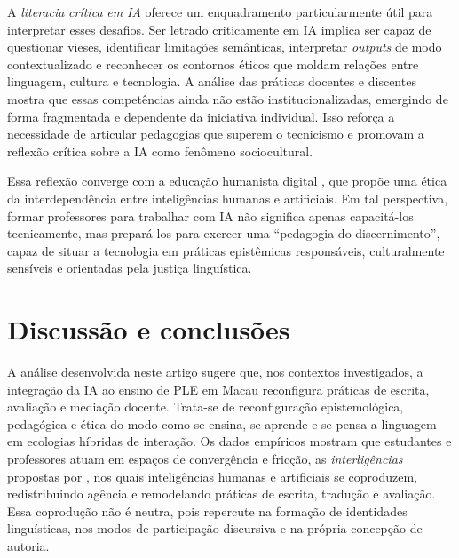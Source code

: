 \documentclass[portuguese]{textolivre}
\begin{document}
A \textit{literacia} \textit{crítica} \textit{em IA} oferece um enquadramento particularmente útil para interpretar esses desafios. Ser letrado criticamente em IA implica ser capaz de questionar vieses, identificar limitações semânticas, interpretar \textit{outputs} de modo contextualizado e reconhecer os contornos éticos que moldam relações entre linguagem, cultura e tecnologia. A análise das práticas docentes e discentes mostra que essas competências ainda não estão institucionalizadas, emergindo de forma fragmentada e dependente da iniciativa individual. Isso reforça a necessidade de articular pedagogias que superem o tecnicismo e promovam a reflexão crítica sobre a IA como fenômeno sociocultural.

Essa reflexão converge com a educação humanista digital \cite{AmaroZhang2025, PiresAmaro2025}, que propõe uma ética da interdependência entre inteligências humanas e artificiais. Em tal perspectiva, formar professores para trabalhar com IA não significa apenas capacitá-los tecnicamente, mas prepará-los para exercer uma “pedagogia do discernimento”, capaz de situar a tecnologia em práticas epistêmicas responsáveis, culturalmente sensíveis e orientadas pela justiça linguística.

\section{Discussão e conclusões}\label{sec-conclusao}

A análise desenvolvida neste artigo sugere que, nos contextos investigados, a integração da IA ao ensino de PLE em Macau reconfigura práticas de escrita, avaliação e mediação docente. Trata-se de reconfiguração epistemológica, pedagógica e ética do modo como se ensina, se aprende e se pensa a linguagem em ecologias híbridas de interação. Os dados empíricos mostram que estudantes e professores atuam em espaços de convergência e fricção, as \textit{interligências} propostas por \textcite{PiresAmaro2025}, nos quais inteligências humanas e artificiais se coproduzem, redistribuindo agência e remodelando práticas de escrita, tradução e avaliação. Essa coprodução não é neutra, pois repercute na formação de identidades linguísticas, nos modos de participação discursiva e na própria concepção de autoria.
\end{document}
